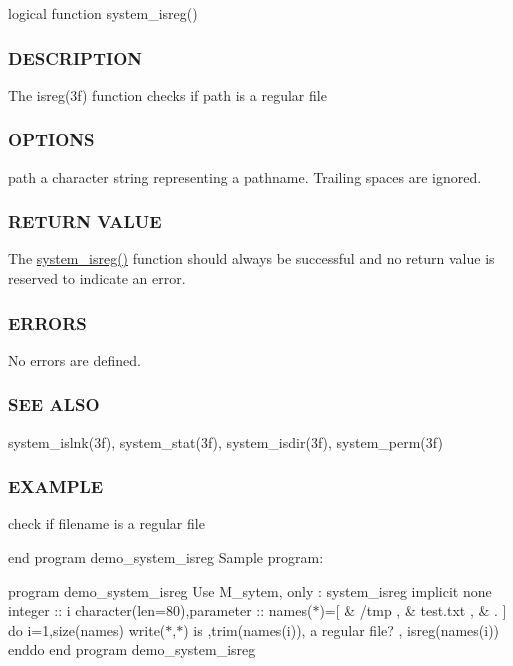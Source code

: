 \begin{DoxyVerb}logical function system_isreg()
\end{DoxyVerb}


\subsubsection*{D\+E\+S\+C\+R\+I\+P\+T\+I\+ON}

The isreg(3f) function checks if path is a regular file

\subsubsection*{O\+P\+T\+I\+O\+NS}

path a character string representing a pathname. Trailing spaces are ignored.

\subsubsection*{R\+E\+T\+U\+RN V\+A\+L\+UE}

The \hyperlink{namespacem__system_a127bdd84ccd4b52f3f29abbc56af029b}{system\+\_\+isreg()} function should always be successful and no return value is reserved to indicate an error.

\subsubsection*{E\+R\+R\+O\+RS}

No errors are defined.

\subsubsection*{S\+EE A\+L\+SO}

system\+\_\+islnk(3f), system\+\_\+stat(3f), system\+\_\+isdir(3f), system\+\_\+perm(3f)

\subsubsection*{E\+X\+A\+M\+P\+LE}

check if filename is a regular file

end program demo\+\_\+system\+\_\+isreg Sample program\+:

program demo\+\_\+system\+\_\+isreg Use M\+\_\+sytem, only \+: system\+\_\+isreg implicit none integer \+:\+: i character(len=80),parameter \+:\+: names($\ast$)=\mbox{[} \& \textquotesingle{}/tmp \textquotesingle{}, \& \textquotesingle{}test.\+txt \textquotesingle{}, \& \textquotesingle{}. \textquotesingle{}\mbox{]} do i=1,size(names) write($\ast$,$\ast$)\textquotesingle{} is \textquotesingle{},trim(names(i)),\textquotesingle{} a regular file? \textquotesingle{}, isreg(names(i)) enddo end program demo\+\_\+system\+\_\+isreg

